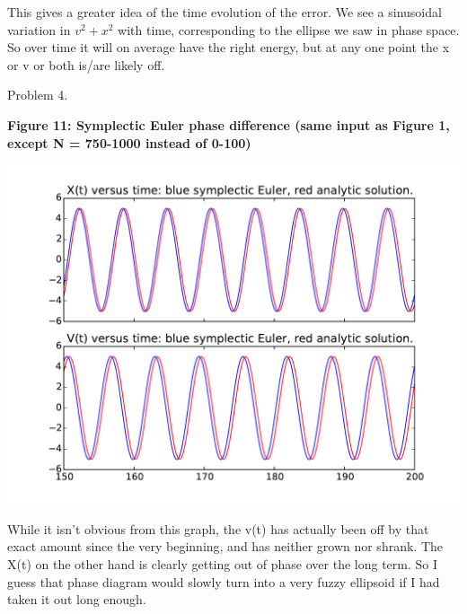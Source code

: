 \documentclass{article}
\begin{document}
This gives a greater idea of the time evolution of the error. We see a sinusoidal variation in $v^2 + x^2$ with time, corresponding to the ellipse we saw in phase space. So over time it will on average have the right energy, but at any one point the x or v or both is/are likely off.

\bigskip

Problem 4.

\bigskip

\begin{minipage}{1.0\textwidth}
\begin{center}
    \textbf{Figure 11: Symplectic Euler phase difference (same input as Figure 1, except N = 750-1000 instead of 0-100)}\par\medskip
    \includegraphics[scale=1.0]{symp_lag}
\end{center}
\end{minipage}

While it isn't obvious from this graph, the v(t) has actually been off by that exact amount since the very beginning, and has neither grown nor shrank. The X(t) on the other hand is clearly getting out of phase over the long term. So I guess that phase diagram would slowly turn into a very fuzzy ellipsoid if I had taken it out long enough.
\end{document}
